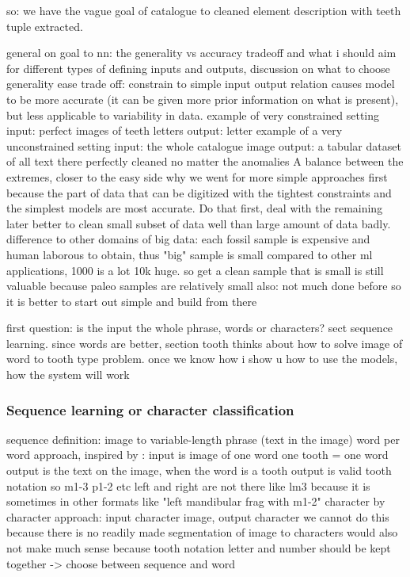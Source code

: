 \documentclass{article}
\begin{document}
so: we have the vague goal of catalogue to cleaned element description with teeth tuple extracted.

general on goal to nn: the generality vs accuracy tradeoff and what i should aim for
different types of defining inputs and outputs, discussion on what to choose
generality ease trade off: constrain to simple input output relation causes model to be 
more accurate (it can be given more prior information on what is present), but less applicable 
to variability in data.
example of very constrained setting
    input: perfect images of teeth letters
    output: letter
example of a very unconstrained setting
    input: the whole catalogue image
    output: a tabular dataset of all text there perfectly cleaned no matter the anomalies
A balance between the extremes, closer to the easy side
why we went for more simple approaches first
    because the part of data that can be digitized with the tightest constraints and the simplest models are most accurate. Do that first, deal with the remaining later
    better to clean small subset of data well than large amount of data badly.
        difference to other domains of big data:
            each fossil sample is expensive and human laborous to obtain, thus "big" sample is 
            small compared to other ml applications, 1000 is a lot 10k huge. \cite{Faith_Lyman_2019}
            so get a clean sample that is small is still valuable because paleo samples are relatively small
        also: not much done before so it is better to start out simple and build from there

first question: is the input the whole phrase, words or characters? sect sequence learning. 
since words are better, section tooth thinks about how to solve image of word to tooth type problem.
once we know how i show u how to use the models, how the system will work

\subsubsection{Sequence learning or character classification}

sequence definition: image to variable-length phrase (text in the image)
word per word approach, inspired by \cite{tibetan_ocr}:
    input is image of one word
        one tooth = one word
    output is the text on the image, when the word is a tooth output is valid tooth notation so m1-3 p1-2 etc
        left and right are not there like lm3 because it is sometimes in other formats like "left mandibular frag with m1-2"
character by character approach: input character image, output character 
    we cannot do this because there is no readily made segmentation of image to characters 
    would also not make much sense because tooth notation letter and number should be kept together
    -> choose between sequence and word
\end{document}
